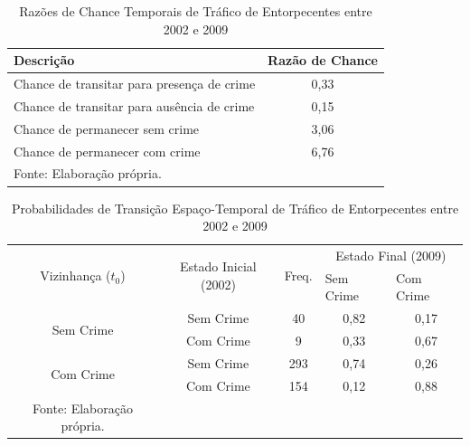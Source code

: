 \documentclass[12pt,openright,oneside,a4paper,english,french,spanish]{abntex2}
\numberwithin{table}{section} %
\numberwithin{figure}{section} %
\begin{document}
\begin{subappendices}
\begin{table}[H]
\centering
\caption{Razões de Chance Temporais de Tráfico de Entorpecentes entre 2002 e 2009}
        \begin{tabular}{lc}
            \hline
            {\textbf{Descrição}} & {\textbf{Razão de Chance}} \\\hline
            {Chance de transitar para presença de crime} & {0,33} \\
            {Chance de transitar para ausência de crime} & {0,15} \\
            {Chance de permanecer sem crime} & {3,06} \\
            {Chance de permanecer com crime} & {6,76} \\\hline
            \tiny Fonte: Elaboração própria.
        \end{tabular}
    \label{tab:odds_tempo_trafico_2002_2009}
\end{table}


\begin{table}[H]
\centering
\caption{Probabilidades de Transição Espaço-Temporal de Tráfico de Entorpecentes entre 2002 e 2009}
        \begin{tabular}{ccccc}
            \hline
            \multirow{2}{*}{Vizinhança ($t_0$)} & \multirow{2}{*}{Estado Inicial (2002)} & \multirow{2}{*}{Freq.} & \multicolumn{2}{c}{Estado Final (2009)}  \\\cline{4-5} %
                                        & & & \multicolumn{1}{l}{Sem Crime} & \multicolumn{1}{l}{Com Crime} \\\hline
            \multirow{2}{*}{Sem Crime} & {Sem Crime} & 40 &  {0,82} & {0,17} \\
                                       & {Com Crime} & 9 &   {0,33} & {0,67} \\\hline
            \multirow{2}{*}{Com Crime} & {Sem Crime} & 293 & {0,74} & {0,26} \\
                                       & {Com Crime} & 154 & {0,12} & {0,88} \\\hline
            \tiny Fonte: Elaboração própria.
        \end{tabular}
    \label{tab:prob_espaco_tempo_trafico_2002_2009}
\end{table}



\end{subappendices}
\end{document}
